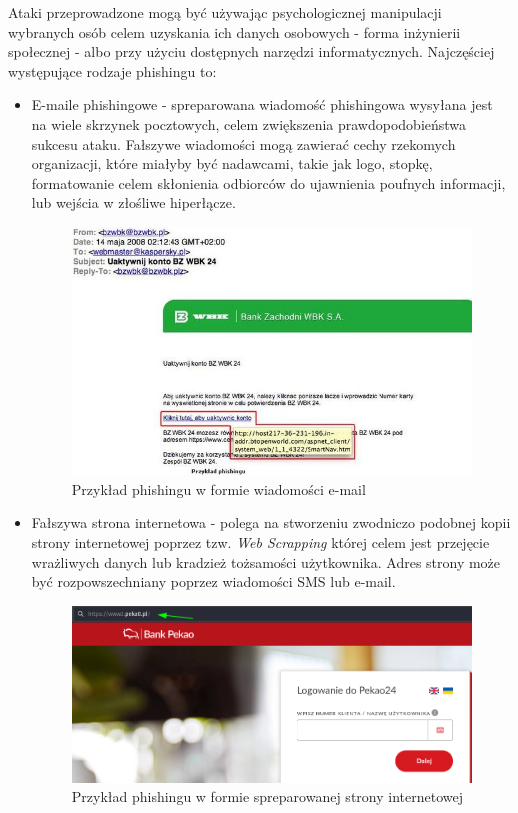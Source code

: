 \documentclass[12pt,twoside]{article}
\begin{document}
Ataki przeprowadzone mogą być używając psychologicznej manipulacji wybranych osób celem uzyskania ich danych osobowych - forma inżynierii społecznej - albo przy użyciu dostępnych narzędzi informatycznych. Najczęściej występujące rodzaje phishingu to:

\begin{itemize}
	 \item E-maile phishingowe - spreparowana wiadomość phishingowa wysyłana jest na wiele skrzynek pocztowych, celem zwiększenia prawdopodobieństwa sukcesu ataku. Fałszywe wiadomości mogą zawierać cechy rzekomych organizacji, które miałyby być nadawcami, takie jak logo, stopkę, formatowanie celem skłonienia odbiorców do ujawnienia poufnych informacji, lub wejścia w złośliwe hiperłącze. \cite{PhishingEmails}
	 
	 \begin{figure}[H]
	 	\centering
	 	\includegraphics[width=1\linewidth]{figures/phishing-example}
	 	\caption{Przykład phishingu w formie wiadomości e-mail \cite{PhishingExample}}
	 	\label{fig:phishing-example}
	 	
	 \end{figure}
 
	 \item Fałszywa strona internetowa - polega na stworzeniu zwodniczo podobnej kopii strony internetowej poprzez tzw. \emph{Web Scrapping} \cite{WebScrapping} której celem jest przejęcie wrażliwych danych lub kradzież tożsamości użytkownika. Adres strony może być rozpowszechniany poprzez wiadomości SMS lub e-mail. \cite{WhatIsPhishing} 
	 
	 
	 \begin{figure}[H]
	 	\centering
	 	\includegraphics[width=0.96\linewidth]{figures/phishing-example2}
	 	\caption{Przykład phishingu w formie spreparowanej strony internetowej}
	 	\label{fig:phishing-example2}
	 \end{figure}
 

\end{itemize}
\end{document}
